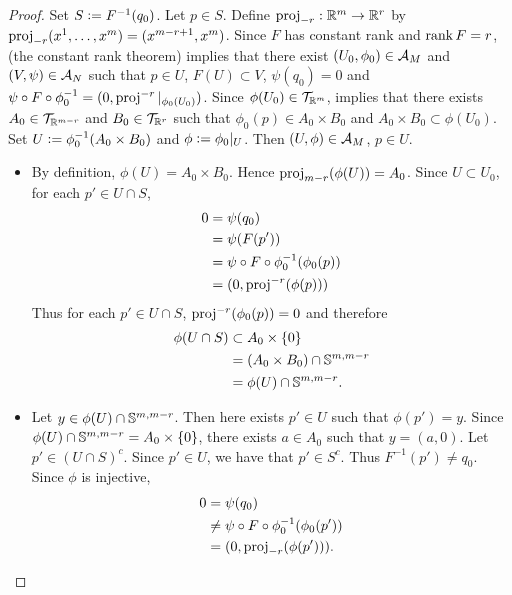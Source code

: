 \documentclass{book}
\begin{document}
	\begin{proof}
		Set $S \defeq F^{-1}(q_0)$. Let $p \in S$. Define $\prj_{-r}: \R^m \rightarrow \R^{r}$ by $\prj_{-r}(x^1, \ldots, x^m) = (x^{m-r+1}, x^{m})$. Since $F$ has constant rank and $\rnk F = r$,  (the constant rank theorem)  implies that there exist $(U_0, \phi_0) \in \MA_M$ and $(V, \psi) \in \MA_N$ such that $p \in U$, $F(U) \subset V$, $\psi(q_0) = 0$ and $\psi \circ F \circ \phi_0^{-1} = (0, \prj^{-r}|_{\phi_0(U_0)})$. Since $\phi(U_0) \in \MT_{\R^m}$,  implies that there exists $A_0 \in \MT_{\R^{m-r}}$ and $B_0 \in \MT_{\R^{r}}$ such that $\phi_0(p) \in A_0 \times B_0$ and $A_0 \times B_0 \subset \phi(U_0)$. Set $U \defeq \phi_0^{-1}(A_0 \times B_0)$ and $\phi \defeq \phi_0|_U$. Then $(U, \phi) \in \MA_M$, $p \in U$. 
		\begin{itemize}
			\item By definition, $\phi(U) = A_0 \times B_0$. Hence $\prj_{m-r}(\phi(U)) = A_0$. Since $U \subset U_0$, for each $p' \in U \cap S$, 
			\begin{align*}
				0
				& = \psi(q_0) \\
				& = \psi(F(p')) \\
				& = \psi \circ F \circ \phi_0^{-1}(\phi_0(p)) \\
				& = (0, \prj^{-r}(\phi(p)))
			\end{align*}
			Thus for each $p' \in U \cap S$, $\prj^{-r}(\phi_0(p)) = 0$ and therefore 
			\begin{align*}
				\phi(U \cap S) 
				& \subset A_0 \times \{0\} \\
				& = (A_0 \times B_0) \cap \S^{m, m-r} \\
				& = \phi(U) \cap \S^{m, m-r}.
			\end{align*}
			\item Let $y \in \phi(U) \cap \S^{m, m-r}$. Then here exists $p' \in U$ such that $\phi(p') = y$. Since  $\phi(U) \cap \S^{m, m-r} = A_0 \times \{0\}$, there exists $a \in A_0$ such that $y = (a, 0)$. Let $p' \in (U \cap S)^c$. Since $p' \in U$, we have that $p' \in S^c$. Thus $F^{-1}(p') \neq q_0$. Since $\phi$ is injective, 
			\begin{align*}
				0
				& = \psi(q_0) \\
				& \neq \psi \circ F \circ \phi_0^{-1}(\phi_0(p')) \\
				& = (0, \prj_{-r}(\phi(p'))).

\end{align*}
\end{itemize}
\end{proof}
\end{document}
